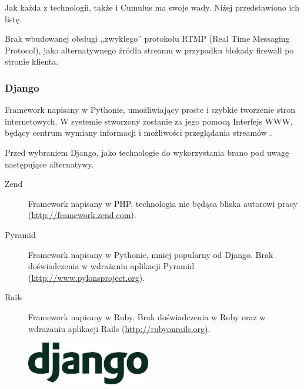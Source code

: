 Jak każda z technologii, także i Cumulus ma swoje wady. Niżej przedstawiono ich listę.
\begin{packed_item}
    \item{Brak wbudowanej obsługi ,,zwykłego'' protokołu RTMP (Real Time Messaging Protocol), jako alternatywnego źródła streamu w przypadku blokady firewall po stronie klienta.}
\end{packed_item}

\newpage
\subsubsection{Django}
Framework napisany w Pythonie, umożliwiający proste i szybkie tworzenie stron internetowych. W systemie stworzony zostanie za jego pomocą Interfejs WWW, będący centrum wymiany informacji i możliwości przeglądania streamów \cite{Django}.

Przed wybraniem Django, jako technologie do wykorzystania brano pod uwagę następujące alternatywy.
\begin{description}
    \item[Zend] Framework napisany w PHP, technologia nie będąca bliska autorowi pracy (\url{http://framework.zend.com}). 
    \item[Pyramid] Framework napisany w Pythonie, mniej popularny od Django. Brak doświadczenia w wdrażaniu aplikacji Pyramid (\url{http://www.pylonsproject.org}).
    \item[Rails] Framework napisany w Ruby. Brak doświadczenia w Ruby oraz w wdrażaniu aplikacji Rails (\url{http://rubyonrails.org}).
\end{description}

\begin{figure}
  \begin{center}
    \includegraphics[width=0.48\textwidth]{img/logos/django.jpg}
  \end{center}
\end{figure}

